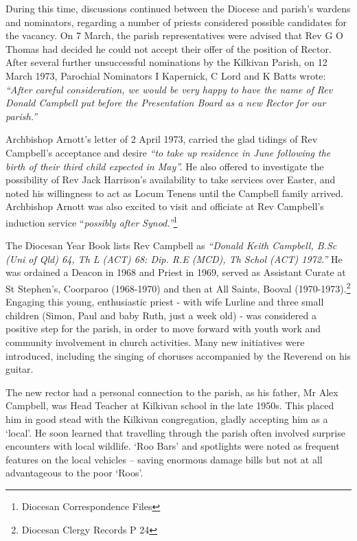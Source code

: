 During this time, discussions continued between the Diocese and parish's wardens and nominators, regarding a number of priests considered possible candidates for the vacancy. On 7 March, the parish representatives were advised that Rev G O Thomas had decided he could not accept their offer of the position of Rector. After several further unsuccessful nominations by the Kilkivan Parish, on 12 March 1973, Parochial Nominators I Kapernick, C Lord and K Batts wrote: \emph{``After careful consideration, we would be very happy to have the name of Rev Donald Campbell put before the Presentation Board as a new Rector for our parish.''}



Archbishop Arnott's letter of 2 April 1973, carried the glad tidings of Rev Campbell's acceptance and desire \emph{``to take up residence in June following the birth of their third child expected in May''.} He also offered to investigate the possibility of Rev Jack Harrison's availability to take services over Easter, and noted his willingness to act as Locum Tenens until the Campbell family arrived. Archbishop Arnott was also excited to visit and officiate at Rev Campbell's induction service ``\emph{possibly after Synod.''}\footnote{Diocesan Correspondence Files}


The Diocesan Year Book lists Rev Campbell as \emph{``Donald Keith Campbell, B.Sc (Uni of Qld) 64, Th L (ACT) 68: Dip. R.E (MCD), Th Schol (ACT) 1972.''} He was ordained a Deacon in 1968 and Priest in 1969, served as Assistant Curate at St Stephen's, Coorparoo (1968-1970) and then at All Saints, Booval (1970-1973).\footnote{Diocesan Clergy Records P 24} Engaging this young, enthusiastic priest - with wife Lurline and three small children (Simon, Paul and baby Ruth, just a week old) - was considered a positive step for the parish, in order to move forward with youth work and community involvement in church activities. Many new initiatives were introduced, including the singing of choruses accompanied by the Reverend on his guitar.


The new rector had a personal connection to the parish, as his father, Mr Alex Campbell, was Head Teacher at Kilkivan school in the late 1950s. This placed him in good stead with the Kilkivan congregation, gladly accepting him as a `local'. He soon learned that travelling through the parish often involved surprise encounters with local wildlife. `Roo Bars' and spotlights were noted as frequent features on the local vehicles -- saving enormous damage bills but not at all advantageous to the poor `Roos'.



